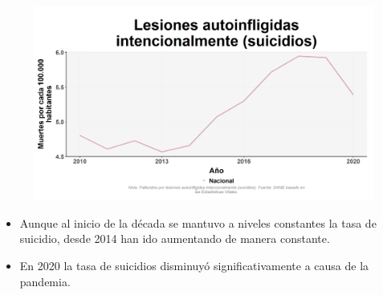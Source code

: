     \begin{figure}[H]
        \caption[Lesiones autoinfligidas intencionalmente (suicidios) a nivel nacional ]{\label{suicid_nal_trend} }
        \begin{center}
        \includegraphics[width=\textwidth,keepaspectratio]{img/var_297_trend.png}
        \end{center}
    \end{figure}
            \begin{itemize}
                \item Aunque al inicio de la década se mantuvo a niveles constantes la tasa de suicidio, desde 2014 han ido aumentando de manera constante.
                \item En 2020 la tasa de suicidios disminuyó significativamente a causa de la pandemia.
                \end{itemize}

